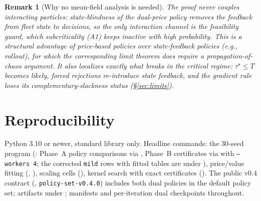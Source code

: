 \documentclass[11pt]{article}
\newtheorem{remark}{Remark}
\begin{document}
\begin{remark}[Why no mean-field analysis is needed]
\label{rem:whynochaos}
The proof never couples interacting particles: state-blindness of the
dual-price policy removes the feedback from fleet state to decisions,
so the only interaction channel is the feasibility guard, which
subcriticality (A1) keeps inactive with high probability. This is a
structural advantage of price-based policies over state-feedback
policies (e.g., rollout), for which the corresponding limit theorem
does require a propagation-of-chaos argument. It also localizes
exactly what breaks in the critical regime: $\tau^{\star} \leq T$
becomes likely, forced rejections re-introduce state feedback, and the
gradient rule loses its complementary-slackness status
(\S\ref{sec:limits}).
\end{remark}

\section{Reproducibility}
\label{sec:repro}

Python 3.10 or newer, standard library only. Headline commands: the
30-seed program (: Phase~A policy
comparisons via , Phase~B
certificates via  with
\texttt{--workers 4}; the corrected \texttt{mild} rows with fitted
tables are under ), price/value fitting
(, ),
scaling cells (),
kernel search with exact certificates
(). The public v0.4 contract
(,
\texttt{policy-set-v0.4.0}) includes both dual policies in the default
policy set; artifacts under ; manifests
and per-iteration dual checkpoints throughout.



\end{document}
